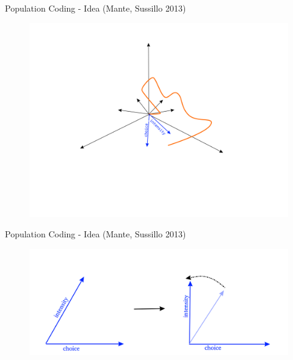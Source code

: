 \documentclass[10pt]{beamer}
\begin{document}
\begin{frame}[fragile]{Population Coding - Idea (Mante, Sussillo 2013)}
\begin{center}
	\begin{figure}
      \includegraphics[width=1.0\textwidth]{new_coord.png}
	\end{figure}
	\end{center}
\end{frame}

\begin{frame}[fragile]{Population Coding - Idea (Mante, Sussillo 2013)}
\begin{center}
	\begin{figure}
      \includegraphics[width=1.0\textwidth]{trafo.png}
	\end{figure}
	\end{center}
\end{frame}
\end{document}
